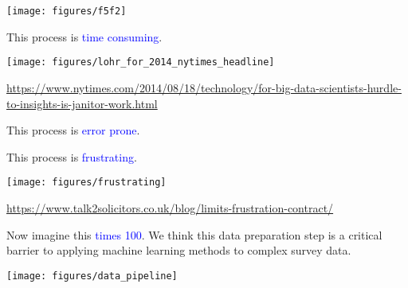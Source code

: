 \documentclass{beamer}
\begin{document}
\begin{frame}

\begin{center}
\texttt{[image: figures/f5f2]}
\end{center}

\end{frame}
\begin{frame}

This process is \textcolor{blue}{time consuming}.

\begin{center}
\texttt{[image: figures/lohr\_for\_2014\_nytimes\_headline]}
\end{center}

\vfill
\tiny{\url{https://www.nytimes.com/2014/08/18/technology/for-big-data-scientists-hurdle-to-insights-is-janitor-work.html}}

\end{frame}
\begin{frame}

This process is \textcolor{blue}{error prone}.

\begin{center}
%
%
\end{center}

\end{frame}
\begin{frame}

This process is \textcolor{blue}{frustrating}.

\begin{center}
\texttt{[image: figures/frustrating]}
\end{center}

\vfill
\tiny{\url{https://www.talk2solicitors.co.uk/blog/limits-frustration-contract/}}

\end{frame}
\begin{frame}

Now imagine this \textcolor{blue}{times 100}. \pause We think this data preparation step is a critical barrier to applying machine learning methods to complex survey data.

\begin{center}
\texttt{[image: figures/data\_pipeline]}
\end{center}

\end{frame}
\end{document}
